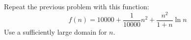 Repeat the previous problem with this function:
\[
f(n) = 10000 + \frac{1}{10000}n^2 + \frac{n^2}{1 + n}\ln n
\]
Use a sufficiently large domain for $n$.
